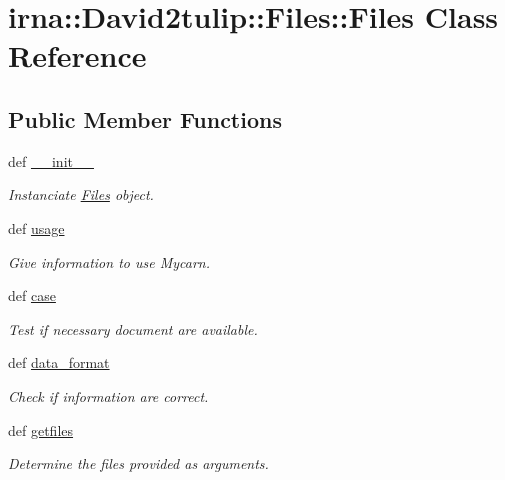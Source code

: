 \hypertarget{classirna_1_1David2tulip_1_1Files_1_1Files}{
\section{irna\-:\-:\-David2tulip\-:\-:\-Files\-:\-:\-Files \-Class \-Reference}
\label{classirna_1_1David2tulip_1_1Files_1_1Files}
}
\subsection*{\-Public \-Member \-Functions}
\begin{DoxyCompactItemize}
\item 
def \hyperlink{classirna_1_1David2tulip_1_1Files_1_1Files_a9f0c6e31e3cf19b7e929c1024a630bb8}{\-\_\-\-\_\-init\-\_\-\-\_\-}
\begin{DoxyCompactList}\small\item\em \-Instanciate \hyperlink{classirna_1_1David2tulip_1_1Files_1_1Files}{\-Files} object. \end{DoxyCompactList}\item 
def \hyperlink{classirna_1_1David2tulip_1_1Files_1_1Files_a5552c62956b066bb64ccdf614c5a8fb4}{usage}
\begin{DoxyCompactList}\small\item\em \-Give information to use \-Mycarn. \end{DoxyCompactList}\item 
def \hyperlink{classirna_1_1David2tulip_1_1Files_1_1Files_a639611d55ab2b8afd67dc178fca060e9}{case}
\begin{DoxyCompactList}\small\item\em \-Test if necessary document are available. \end{DoxyCompactList}\item 
def \hyperlink{classirna_1_1David2tulip_1_1Files_1_1Files_ac7599c9aa87bf2885835091b40e16470}{data\-\_\-format}
\begin{DoxyCompactList}\small\item\em \-Check if information are correct. \end{DoxyCompactList}\item 
def \hyperlink{classirna_1_1David2tulip_1_1Files_1_1Files_a708228552f9409a63abc0c7419d13dc1}{getfiles}
\begin{DoxyCompactList}\small\item\em \-Determine the files provided as arguments. \end{DoxyCompactList}\end{DoxyCompactItemize}

